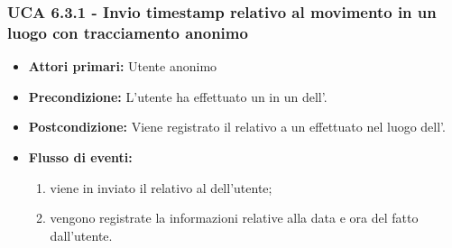 \subsubsection{UCA 6.3.1 - Invio timestamp relativo al movimento in un luogo con tracciamento anonimo}
\begin{itemize}
	\item \textbf{Attori primari:} Utente anonimo
	\item \textbf{Precondizione:} L'utente ha effettuato un  in un  dell'.
	\item \textbf{Postcondizione:} Viene registrato il  relativo a un  effettuato nel luogo dell'.
	\item \textbf{Flusso di eventi:}
	\begin{enumerate}
		\item viene in inviato il  relativo al  dell'utente;
		\item vengono registrate la informazioni relative alla data e ora del  fatto dall'utente.
	\end{enumerate}
\end{itemize}

